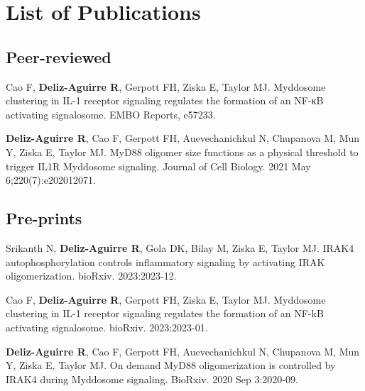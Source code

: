 \cleardoublepage
{}
{}
\tableofcontents
{}

\cleardoublepage
{}
{}
\listoffigures
{}

\cleardoublepage
{}
{}
\chapter*{List of Publications}
\section*{Peer-reviewed}
\sectionmark{}

\begin{hangparas}{.5in}{1}
\setlength{\parskip}{0pt}
Cao F, \textbf{Deliz-Aguirre R}, Gerpott FH, Ziska E, Taylor MJ. Myddosome clustering in IL-1 receptor signaling regulates the formation of an NF-κB activating signalosome. EMBO Reports, e57233.

\textbf{Deliz-Aguirre R}, Cao F, Gerpott FH, Auevechanichkul N, Chupanova M, Mun Y, Ziska E, Taylor MJ. MyD88 oligomer size functions as a physical threshold to trigger IL1R Myddosome signaling. Journal of Cell Biology. 2021 May 6;220(7):e202012071.
\end{hangparas}

\section*{Pre-prints}
\begin{hangparas}{.5in}{1}
\setlength{\parskip}{0pt}
Srikanth N, \textbf{Deliz-Aguirre R}, Gola DK, Bilay M, Ziska E, Taylor MJ. IRAK4 autophosphorylation controls inflammatory signaling by activating IRAK oligomerization. bioRxiv. 2023:2023-12.

Cao F, \textbf{Deliz-Aguirre R}, Gerpott FH, Ziska E, Taylor MJ. Myddosome clustering in IL-1 receptor signaling regulates the formation of an NF-kB activating signalosome. bioRxiv. 2023:2023-01.

\textbf{Deliz-Aguirre R}, Cao F, Gerpott FH, Auevechanichkul N, Chupanova M, Mun Y, Ziska E, Taylor MJ. On demand MyD88 oligomerization is controlled by IRAK4 during Myddosome signaling. BioRxiv. 2020 Sep 3:2020-09.
\end{hangparas}

